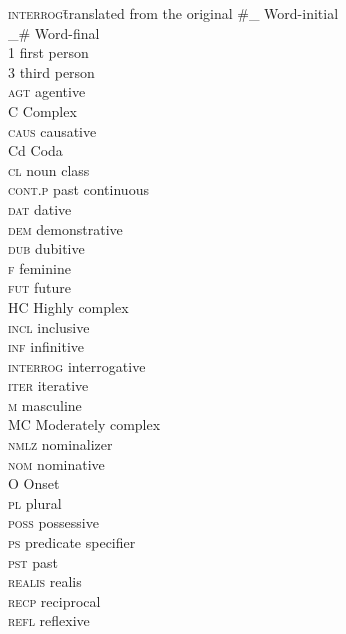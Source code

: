 \addchap{\lsAbbreviationsTitle} 
\begin{multicols}{2}
\begin{tabbing}
\textsc{interrog}\hspace{1em}\= translated from the original\kill
\#\_            \> Word-initial\\
\_\#             \> Word-final\\
1                 \> first person\\
3                 \> third person\\
\textsc{agt}      \> agentive\\
C                 \> Complex\\
\textsc{caus}     \> causative\\
Cd                \> Coda\\
\textsc{cl}       \> noun class\\
\textsc{cont.p}   \> past continuous\\
\textsc{dat}      \> dative\\
\textsc{dem}      \> demonstrative\\
\textsc{dub}      \> dubitive\\
\textsc{f}        \> feminine\\
\textsc{fut}      \> future\\
HC                \> Highly complex\\
\textsc{incl}     \> inclusive\\
\textsc{inf}      \> infinitive\\
\textsc{interrog} \> interrogative\\
\textsc{iter}     \> iterative\\
\textsc{m}        \> masculine\\
MC                \> Moderately complex\\
\textsc{nmlz}     \> nominalizer\\
\textsc{nom}      \> nominative\\
O                 \> Onset\\
\textsc{pl}       \> plural\\
\textsc{poss}     \> possessive\\
\textsc{ps}       \> predicate specifier\\
\textsc{pst}      \> past\\
\textsc{realis}   \> realis\\
\textsc{recp}     \> reciprocal\\
\textsc{refl}     \> reflexive\\

\end{tabbing}
\end{multicols}
